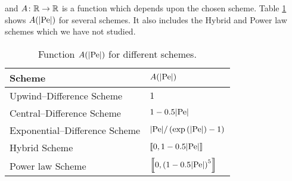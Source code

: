 and $A \colon \mathbb{R} \rightarrow \mathbb{R}$ is a function which depends upon the
chosen scheme. Table \ref{tab:small_molecule_schemes_coefficients} shows
$A(\abs{\mathrm{Pe}})$ for several schemes. It also includes the Hybrid and Power
law schemes which we have not studied.
\begin{table}[ht]
	\centering
	\begin{tabular}{ll}
		\toprule[0.50mm]
		Scheme & $A(\abs{\mathrm{Pe}})$ \\
		\midrule[0.25mm]
		Upwind--Difference Scheme & 
		$1$ \\

		Central--Difference Scheme & 
		$1 - 0.5 \abs{\mathrm{Pe}}$ \\

		Exponential--Difference Scheme & 
		$\abs{\mathrm{Pe}} / \left( \exp\left( \abs{\mathrm{Pe}} \right) - 1 \right)$ \\

		Hybrid Scheme & 
		$\left\llbracket 0, 1 - 0.5 \abs{\mathrm{Pe}} \right\rrbracket$\\

		Power law Scheme & 
		$\left\llbracket 0, \left(1 - 0.5 \abs{\mathrm{Pe}}\right)^5 \right\rrbracket$\\
		\bottomrule[0.50mm]
	\end{tabular}
	\captionsetup{width=0.7\linewidth}
	\caption{Function $A(\abs{\mathrm{Pe}})$ for different schemes\cite{patankar2008numerical}.}
	\label{tab:small_molecule_schemes_coefficients}
\end{table}

